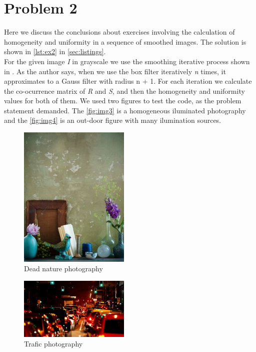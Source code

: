 \documentclass[a4paper,10pt]{article}
\begin{document}
\section{Problem 2}
Here we discuss the conclusions about exercises involving  the calculation of homogeneity and uniformity in a sequence of smoothed images. 
The solution is shown in \autoref{lst:ex2} in \autoref{sec:listings}. \\
For the given image \textit{I} in grayscale we use the smoothing iterative process shown in \cite[p. 72]{Klette:Concise_Computer_Vision}.
As the author says, when we use the box filter iteratively \textit{n} times, it approximates to a Gauss filter with radius n + 1. 
For each iteration we calculate the co-ocurrence matrix of \textit{R} and \textit{S}, and then the homogeneity and uniformity values for
both of them.
We used two figures to test the code, as the problem statement demanded. The \autoref{fig:img3} is a homogeneous iluminated photography
and the \autoref{fig:img4} is an out-door figure with many ilumination sources.

\begin{figure}[H]
  \centering
  \includegraphics[width=200px]{../images/dead_nature}
  \caption{Dead nature photography}
  \label{fig:img3}
\end{figure}

\begin{figure}[H]
  \centering
  \includegraphics[width=200px]{../images/transito}
  \caption{Trafic photography}
  \label{fig:img4}
\end{figure}
\end{document}
